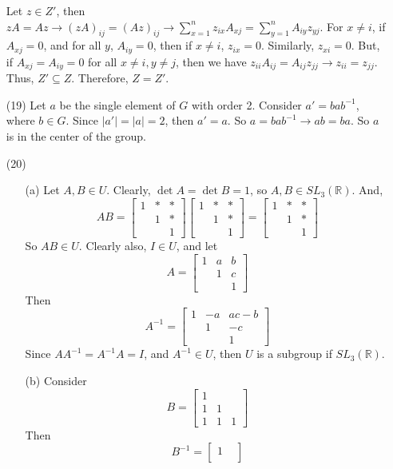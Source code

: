 \begin{itemize}
Let $z \in Z'$, then $zA = Az \rightarrow (zA)_{ij} = (Az)_{ij} \rightarrow \sum_{x=1}^n z_{ix}A_{xj} = \sum_{y=1}^n A_{iy}z_{yj}$. For $x \neq i$, if $A_{xj} = 0$, and for all $y$, $A_{iy} = 0$, then if $x \neq i$, $z_{ix} = 0$. Similarly, $z_{xi} = 0$. But, if $A_{xj} = A_{iy} = 0$ for all $x \neq i, y \neq j$, then we have $z_{ii}A_{ij} = A_{ij}z_{jj} \rightarrow z_{ii} = z_{jj}$. Thus, $Z' \subseteq Z$. Therefore, $Z = Z'$.
\item[(19)]
Let $a$ be the single element of $G$ with order 2. Consider $a' = bab^{-1}$, where $b \in G$. Since $|a'| = |a| = 2$, then $a' = a$. So $a = bab^{-1} \rightarrow ab = ba$. So $a$ is in the center of the group.
\item[(20)]
\begin{itemize}
\item[(a)]
Let $A, B \in U$. Clearly, $\det A = \det B = 1$, so $A, B \in SL_3(\mathbb{R})$. And,
$$AB = \begin{bmatrix}
1 & * & * \\
& 1 & * \\
& & 1
\end{bmatrix}\begin{bmatrix}
1 & * & * \\
& 1 & * \\
& & 1
\end{bmatrix} = \begin{bmatrix}
1 & * & * \\
& 1 & * \\
& & 1
\end{bmatrix}$$
So $AB \in U$. Clearly also, $I \in U$, and let
$$A = \begin{bmatrix}
1 & a & b \\
& 1 & c \\
& & 1
\end{bmatrix}$$
Then
$$A^{-1} = \begin{bmatrix}
1 & -a & ac - b \\
& 1 & -c \\
& & 1
\end{bmatrix}$$
Since $AA^{-1} = A^{-1}A = I$, and $A^{-1} \in U$, then $U$ is a subgroup if $SL_3(\mathbb{R})$.
\item[(b)]
Consider
$$B = \begin{bmatrix}
1 \\
1 & 1 \\
1 & 1 & 1
\end{bmatrix}$$
Then
$$B^{-1} = \begin{bmatrix}
1 & \\

\end{bmatrix}$$
\end{itemize}
\end{itemize}
